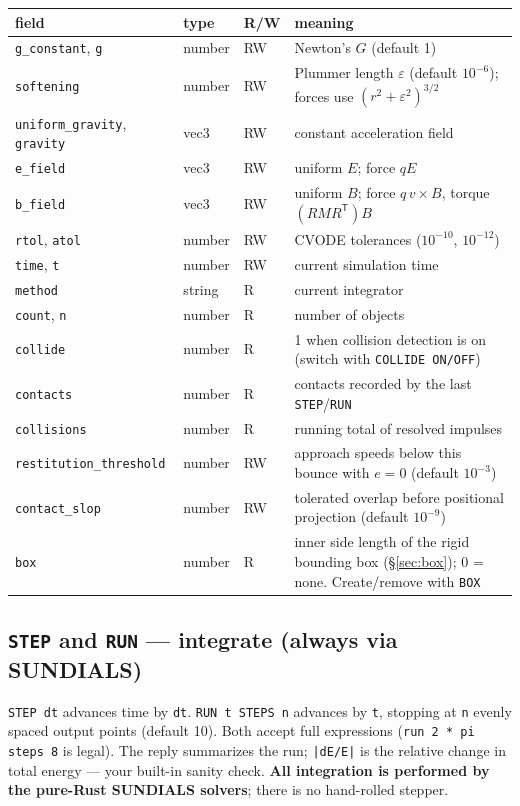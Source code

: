 \documentclass[11pt]{article}
\newcommand{\kw}[1]{\texttt{\uppercase{#1}}}
\newcommand{\code}[1]{\texttt{#1}}
\begin{document}
\begin{center}
\begin{tabular}{lllp{6.2cm}}
\textbf{field} & \textbf{type} & \textbf{R/W} & \textbf{meaning}\\\hline
\code{g\_constant}, \code{g} & number & RW & Newton's $G$ (default 1)\\
\code{softening} & number & RW & Plummer length $\varepsilon$ (default $10^{-6}$); forces use $(r^2+\varepsilon^2)^{3/2}$\\
\code{uniform\_gravity}, \code{gravity} & vec3 & RW & constant acceleration field\\
\code{e\_field} & vec3 & RW & uniform $E$; force $qE$\\
\code{b\_field} & vec3 & RW & uniform $B$; force $q\,v\times B$, torque $(RMR^{\mathsf T})B$\\
\code{rtol}, \code{atol} & number & RW & CVODE tolerances ($10^{-10}$, $10^{-12}$)\\
\code{time}, \code{t} & number & RW & current simulation time\\
\code{method} & string & R & current integrator\\
\code{count}, \code{n} & number & R & number of objects\\
\code{collide} & number & R & 1 when collision detection is on (switch with \kw{collide on/off})\\
\code{contacts} & number & R & contacts recorded by the last \kw{step}/\kw{run}\\
\code{collisions} & number & R & running total of resolved impulses\\
\code{restitution\_threshold} & number & RW & approach speeds below this bounce with $e=0$ (default $10^{-3}$)\\
\code{contact\_slop} & number & RW & tolerated overlap before positional projection (default $10^{-9}$)\\
\code{box} & number & R & inner side length of the rigid bounding box (\S\ref{sec:box}); 0 = none. Create/remove with \kw{box}\\
\end{tabular}
\end{center}

\subsection{\kw{step} and \kw{run} --- integrate (always via SUNDIALS)}

\code{STEP dt} advances time by \code{dt}. \code{RUN t STEPS n} advances
by \code{t}, stopping at \code{n} evenly spaced output points (default
10). Both accept full expressions (\code{run 2 * pi steps 8} is legal).
The reply summarizes the run; \code{|dE/E|} is the relative change in
total energy --- your built-in sanity check. \textbf{All integration is
performed by the pure-Rust SUNDIALS solvers}; there is no hand-rolled
stepper.
\end{document}
